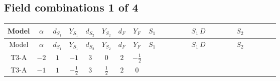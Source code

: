 \documentclass[8pt]{article}
\begin{document}
\begin{landscape}
\subsection*{Field combinations 1 of 4}
\begin{longtable}{@{}cccccccc >{\raggedright\arraybackslash}p{0.21\linewidth} >{\raggedright\arraybackslash}p{0.21\linewidth} >{\raggedright\arraybackslash}p{0.21\linewidth}@{}}
\toprule
Model & $\alpha$ & $d_{S_1}$ & $Y_{S_1}$ & $d_{S_2}$ & $Y_{S_2}$ & $d_F$ & $Y_F$ & $S_1$ & $S_1\,D$ & $S_2$ \\
\midrule
\endfirsthead
\toprule
Model & $\alpha$ & $d_{S_1}$ & $Y_{S_1}$ & $d_{S_2}$ & $Y_{S_2}$ & $d_F$ & $Y_F$ & $S_1$ & $S_1\,D$ & $S_2$ \\
\midrule
\endhead
T3-A & $-2$ & $1$ & $-1$ & $3$ & $0$ & $2$ & $-\frac{1}{2}$ & \scriptsize\adjustbox{max width=\linewidth}{$\begin{gathered} -S_1 S_1{}^{\dagger } m_1^2 \\ +\frac{1}{2} S_1^2 \left(S_1{}^{\dagger }\right){}^2 \lambda_{S_1}^{(1)}^{(1)}\end{gathered}$} & \scriptsize\adjustbox{max width=\linewidth}{$\begin{gathered} +D_{\mu _1}\left(S_1\right){}^{\dagger } D_{\mu _1}\left(S_1\right)\end{gathered}$} & \scriptsize\adjustbox{max width=\linewidth}{$\begin{gathered} -m_2^2 S_{2,j_1} S_{2,j_1}{}^{\dagger } \\ +\frac{1}{2} S_{2,j_3} S_{2,j_4} S_{2,j_1}{}^{\dagger } S_{2,j_2}{}^{\dagger } \mathcal{I}_{S_2,j_1,j_3,j_2,j_4}{}^1 \lambda_{S_2}^{(1)}^{(1)} \\ +\frac{1}{2} S_{2,j_3} S_{2,j_4} S_{2,j_1}{}^{\dagger } S_{2,j_2}{}^{\dagger } \mathcal{I}_{S_2,j_1,j_3,j_2,j_4}{}^2 \lambda_{S_2}^{(1)}^{(2)}\end{gathered}$} \\
\midrule
T3-A & $-1$ & $1$ & $-\frac{1}{2}$ & $3$ & $\frac{1}{2}$ & $2$ & $0$ & \scriptsize\adjustbox{max width=\linewidth}{$\begin{gathered} -S_1 S_1{}^{\dagger } m_1^2 \\ +\frac{1}{2} S_1^2 \left(S_1{}^{\dagger }\right){}^2 \lambda_{S_1}^{(1)}^{(1)}\end{gathered}$} & \scriptsize\adjustbox{max width=\linewidth}{$\begin{gathered} +D_{\mu _1}\left(S_1\right){}^{\dagger } D_{\mu _1}\left(S_1\right)\end{gathered}$} & \scriptsize\adjustbox{max width=\linewidth}{$\begin{gathered} -m_2^2 S_{2,j_1} S_{2,j_1}{}^{\dagger } \\ +\frac{1}{2} S_{2,j_3} S_{2,j_4} S_{2,j_1}{}^{\dagger } S_{2,j_2}{}^{\dagger } \mathcal{I}_{S_2,j_1,j_3,j_2,j_4}{}^1 \lambda_{S_2}^{(1)}^{(1)} \\ +\frac{1}{2} S_{2,j_3} S_{2,j_4} S_{2,j_1}{}^{\dagger } S_{2,j_2}{}^{\dagger } \mathcal{I}_{S_2,j_1,j_3,j_2,j_4}{}^2 \lambda_{S_2}^{(1)}^{(2)}\end{gathered}$} \\

\end{longtable}
\end{landscape}
\end{document}
